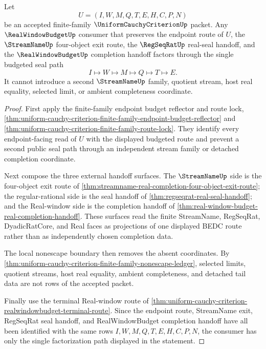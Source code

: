 \begin{theorem}
\label{thm:uniform-cauchy-criterion-finite-family-budget-seal-composition}
Let
$$
U=(I,W,M,Q,T,E,H,C,P,N)
$$
be an accepted finite-family $\UniformCauchyCriterionUp$ packet. Any $\RealWindowBudgetUp$ consumer that preserves the endpoint route of $U$, the $\StreamNameUp$ four-object exit route, the $\RegSeqRatUp$ real-seal handoff, and the $\RealWindowBudgetUp$ completion handoff factors through the single budgeted seal path
$$
I \longmapsto W \longmapsto M \longmapsto Q \longmapsto T \longmapsto E.
$$
It cannot introduce a second $\StreamNameUp$ family, quotient stream, host real equality, selected limit, or ambient completeness coordinate.
\end{theorem}
\begin{proof}
First apply the finite-family endpoint budget reflector and route lock, \autoref{thm:uniform-cauchy-criterion-finite-family-endpoint-budget-reflector} and \autoref{thm:uniform-cauchy-criterion-finite-family-route-lock}. They identify every endpoint-facing read of $U$ with the displayed budgeted route and prevent a second public seal path through an independent stream family or detached completion coordinate.

Next compose the three external handoff surfaces. The $\StreamNameUp$ side is the four-object exit route of \autoref{thm:streamname-real-completion-four-object-exit-route}; the regular-rational side is the seal handoff of \autoref{thm:regseqrat-real-seal-handoff}; and the Real-window side is the completion handoff of \autoref{thm:real-window-budget-real-completion-handoff}. These surfaces read the finite StreamName, RegSeqRat, DyadicRatCore, and Real faces as projections of one displayed BEDC route rather than as independently chosen completion data.

The local nonescape boundary then removes the absent coordinates. By \autoref{thm:uniform-cauchy-criterion-finite-family-nonescape-ledger}, selected limits, quotient streams, host real equality, ambient completeness, and detached tail data are not rows of the accepted packet.

Finally use the terminal Real-window route of \autoref{thm:uniform-cauchy-criterion-realwindowbudget-terminal-route}. Since the endpoint route, StreamName exit, RegSeqRat seal handoff, and RealWindowBudget completion handoff have all been identified with the same rows $I,W,M,Q,T,E,H,C,P,N$, the consumer has only the single factorization path displayed in the statement.
\end{proof}

